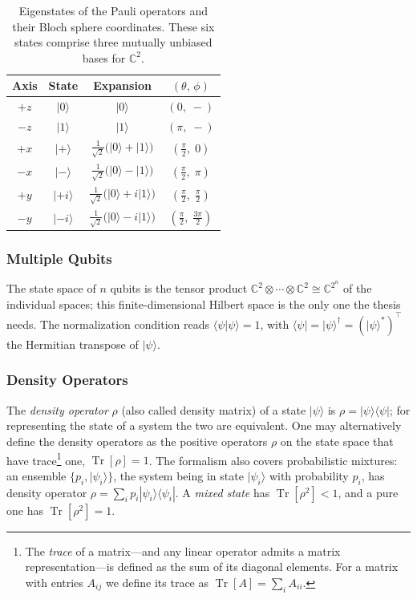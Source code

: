 \documentclass[11pt, oneside, openany]{scrbook}
\DeclareMathOperator{\Tr}{Tr}
\newcommand{\ket}[1]{|#1\rangle}
\newcommand{\bra}[1]{\langle#1|}
\newcommand{\braket}[2]{\langle#1|#2\rangle}
\newcommand{\ketbra}[2]{|#1\rangle\langle#2|}
\begin{document}
\begin{table}[h]
\centering
\renewcommand{\arraystretch}{1.05}
\begin{tabular}{cccc}
  \hline
  \textbf{Axis} & \textbf{State} & \textbf{Expansion} & $(\theta,\,\phi)$ \\
  \hline
  $+z$ & $\ket{0}$  & $\ket{0}$ & $(0,\;-)$ \\
  $-z$ & $\ket{1}$  & $\ket{1}$ & $(\pi,\;-)$ \\
  $+x$ & $\ket{+}$  & $\tfrac{1}{\sqrt{2}}\bigl(\ket{0}+\ket{1}\bigr)$ & $(\tfrac{\pi}{2},\;0)$ \\
  $-x$ & $\ket{-}$  & $\tfrac{1}{\sqrt{2}}\bigl(\ket{0}-\ket{1}\bigr)$ & $(\tfrac{\pi}{2},\;\pi)$ \\
  $+y$ & $\ket{+i}$ & $\tfrac{1}{\sqrt{2}}\bigl(\ket{0}+i\ket{1}\bigr)$ & $(\tfrac{\pi}{2},\;\tfrac{\pi}{2})$ \\
  $-y$ & $\ket{-i}$ & $\tfrac{1}{\sqrt{2}}\bigl(\ket{0}-i\ket{1}\bigr)$ & $(\tfrac{\pi}{2},\;\tfrac{3\pi}{2})$ \\
  \hline
\end{tabular}
\caption{Eigenstates of the Pauli operators and their Bloch sphere coordinates.
  These six states comprise three mutually unbiased bases for $\mathbb{C}^{2}$.}
\label{tab:pauli-eigenstates}
\end{table}

\subsubsection{Multiple Qubits}

The state space of $n$ qubits is the tensor product $\mathbb{C}^2 \otimes \cdots \otimes \mathbb{C}^2 \cong \mathbb{C}^{2^n}$ of the individual spaces; this finite-dimensional Hilbert space is the only one the thesis needs. The normalization condition reads $\braket{\psi}{\psi} = 1$, with $\bra{\psi} = \ket{\psi}^\dagger = (\ket{\psi}^*)^\top$ the Hermitian transpose of $\ket{\psi}$.

\subsubsection{Density Operators}

The \textit{density operator} $\rho$ (also called density matrix) of a state $\ket{\psi}$ is $\rho = \ketbra{\psi}{\psi}$; for representing the state of a system the two are equivalent. One may alternatively define the density operators as the positive operators $\rho$ on the state space that have trace\footnote{The \textit{trace} of a matrix---and any linear operator admits a matrix representation---is defined as the sum of its diagonal elements. For a matrix with entries $A_{ij}$ we define its trace as $\Tr[A] = \sum_{i} A_{ii}$.} one, $\Tr[\rho] = 1$. The formalism also covers probabilistic mixtures: an ensemble $\{p_i, \ket{\psi_i}\}$, the system being in state $\ket{\psi_i}$ with probability $p_i$, has density operator $\rho = \sum_{i} p_i \ketbra{\psi_i}{\psi_i}$. A \textit{mixed state} has $\Tr[\rho^2] < 1$, and a pure one has $\Tr[\rho^2] = 1$.
\end{document}
